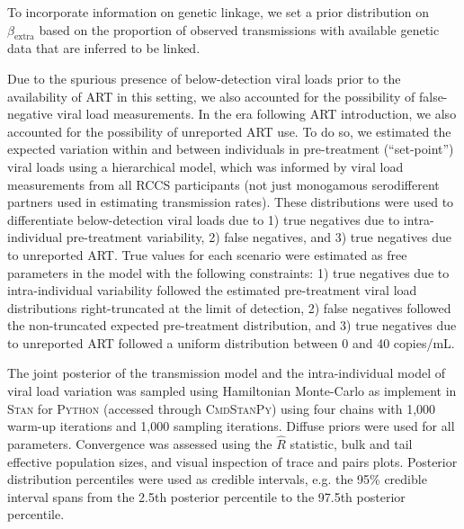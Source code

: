\documentclass{article}[11pt]
\begin{document}
To incorporate information on genetic linkage, we set a prior distribution on $\beta_\text{extra}$ based on the proportion of observed transmissions with available genetic data that are inferred to be linked. 
 
Due to the spurious presence of below-detection viral loads prior to the availability of ART in this setting, we also accounted for the possibility of false-negative viral load measurements. In the era following ART introduction, we also accounted for the possibility of unreported ART use. To do so, we estimated the expected variation within and between individuals in pre-treatment (``set-point'') viral loads using a hierarchical model, which was informed by viral load measurements from all RCCS participants (not just monogamous serodifferent partners used in estimating transmission rates). These distributions were used to differentiate below-detection viral loads due to 1) true negatives due to intra-individual pre-treatment variability, 2) false negatives, and 3) true negatives due to unreported ART. True values for each scenario were estimated as free parameters in the model with the following constraints: 1) true negatives due to intra-individual variability followed the estimated pre-treatment viral load distributions right-truncated at the limit of detection, 2) false negatives followed the non-truncated expected pre-treatment distribution, and 3) true negatives due to unreported ART followed a uniform distribution between 0 and 40 copies/mL. 

The joint posterior of the transmission model and the intra-individual model of viral load variation was sampled using Hamiltonian Monte-Carlo as implement in \textsc{Stan} for \textsc{Python} (accessed through \textsc{CmdStanPy}) using four chains with 1,000 warm-up iterations and 1,000 sampling iterations. Diffuse priors were used for all parameters. Convergence was assessed using the $\hat{R}$ statistic, bulk and tail effective population sizes, and visual inspection of trace and pairs plots. Posterior distribution percentiles were used as credible intervals, e.g. the 95\% credible interval spans from the 2.5th posterior percentile to the 97.5th posterior percentile.  
\end{document}
